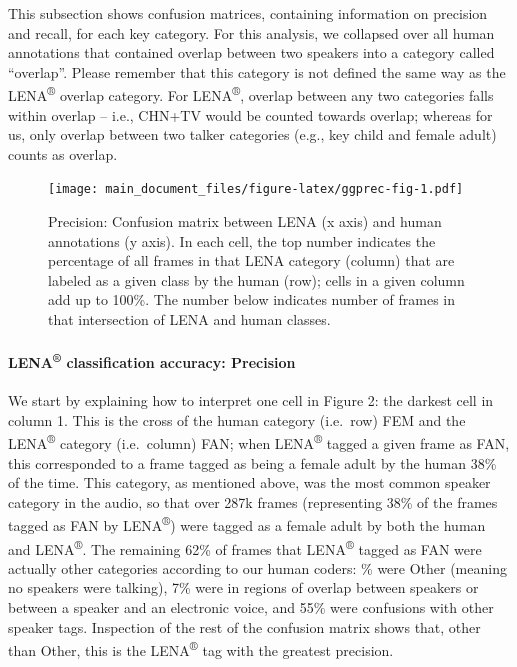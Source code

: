 \documentclass[english,table,man,floatsintext]{apa6}
\let\oldparagraph\paragraph
\renewcommand{\paragraph}[1]{\oldparagraph{#1}\mbox{}}
\begin{document}
This subsection shows confusion matrices, containing information on precision and recall, for each key category. For this analysis, we collapsed over all human annotations that contained overlap between two speakers into a category called \enquote{overlap}. Please remember that this category is not defined the same way as the LENA\textsuperscript{®} overlap category. For LENA\textsuperscript{®}, overlap between any two categories falls within overlap -- i.e., CHN+TV would be counted towards overlap; whereas for us, only overlap between two talker categories (e.g., key child and female adult) counts as overlap.

\begin{figure}
\centering
\texttt{[image: main\_document\_files/figure-latex/ggprec-fig-1.pdf]}
\caption{\label{fig:ggprec-fig}Precision: Confusion matrix between LENA (x axis) and human annotations (y axis). In each cell, the top number indicates the percentage of all frames in that LENA category (column) that are labeled as a given class by the human (row); cells in a given column add up to 100\%. The number below indicates number of frames in that intersection of LENA and human classes.}
\end{figure}

\hypertarget{lena-classification-accuracy-precision}{%
\paragraph{\texorpdfstring{LENA\textsuperscript{®} classification accuracy: Precision}{LENA® classification accuracy: Precision}}\label{lena-classification-accuracy-precision}}

We start by explaining how to interpret one cell in Figure 2: the darkest cell in column 1. This is the cross of the human category (i.e.~row) FEM and the LENA\textsuperscript{®} category (i.e.~column) FAN; when LENA\textsuperscript{®} tagged a given frame as FAN, this corresponded to a frame tagged as being a female adult by the human 38\% of the time. This category, as mentioned above, was the most common speaker category in the audio, so that over 287k frames (representing 38\% of the frames tagged as FAN by LENA\textsuperscript{®}) were tagged as a female adult by both the human and LENA\textsuperscript{®}. The remaining 62\% of frames that LENA\textsuperscript{®} tagged as FAN were actually other categories according to our human coders: \% were Other (meaning no speakers were talking), 7\% were in regions of overlap between speakers or between a speaker and an electronic voice, and 55\% were confusions with other speaker tags. Inspection of the rest of the confusion matrix shows that, other than Other, this is the LENA\textsuperscript{®} tag with the greatest precision.
\end{document}

